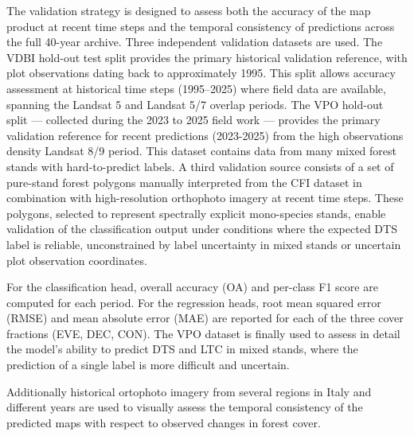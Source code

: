 \documentclass[essd, manuscript]{copernicus}
\begin{document}
The validation strategy is designed to assess both the accuracy of the map product at recent time steps and the temporal consistency of predictions across the full 40-year archive. Three independent validation datasets are used.
The VDBI hold-out test split provides the primary historical validation reference, with plot observations dating back to approximately 1995. This split allows accuracy assessment at historical time steps (1995–2025) where field data are available, spanning the Landsat 5 and Landsat 5/7 overlap periods. The VPO hold-out split — collected during the 2023 to 2025 field work — provides the primary validation reference for recent predictions (2023-2025) from the high observations density Landsat 8/9 period. This dataset contains data from many mixed forest stands with hard-to-predict labels. %
A third validation source consists of a set of pure-stand forest polygons manually interpreted from the CFI dataset in combination with high-resolution orthophoto imagery at recent time steps. These polygons, selected to represent spectrally explicit mono-species stands, enable validation of the classification output under conditions where the expected DTS label is reliable, unconstrained by label uncertainty in mixed stands or uncertain plot observation coordinates.
 
For the classification head, overall accuracy (OA) and per-class F1 score are computed for each period. For the regression heads, root mean squared error (RMSE) and mean absolute error (MAE) are reported for each of the three cover fractions (EVE, DEC, CON). The VPO dataset is finally used to assess in detail the model's ability to predict DTS and LTC in mixed stands, where the prediction of a single label is more difficult and uncertain.

Additionally historical ortophoto imagery from several regions in Italy and different years are used to visually assess the temporal consistency of the predicted maps with respect to observed changes in forest cover.
\end{document}
